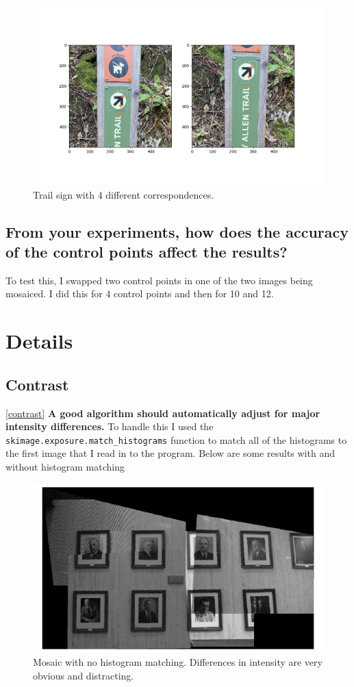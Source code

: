 \documentclass[]{article}
\begin{document}
		\begin{figure}[H]
			\centering
			\includegraphics[width=6.5in]{test_images/sign_4_1_correspondences.png}
			\caption{Trail sign with 4 different correspondences.}
		\end{figure}
		
	\subsection{From your experiments, how does the accuracy of the control points affect the results?}
		To test this, I swapped two control points in one of the two images being mosaiced. I did this for 4 control points and then for 10 and 12. 

\section{Details}
	\subsection{Contrast}
	\ref{contrast}
	\textbf{A good algorithm should automatically adjust for major intensity differences.}
	\vskip 10pt
	To handle this I used the \texttt{skimage.exposure.match\_histograms} function to match all of the histograms to the first image that I read in to the program. Below are some results with and without histogram matching
	
	\begin{figure}[H]
		\centering
		\includegraphics[width=6.5in]{test_images/no_hist_match.png}
		\caption{Mosaic with no histogram matching. Differences in intensity are very obvious and distracting.}
	\end{figure}
	
\end{document}
